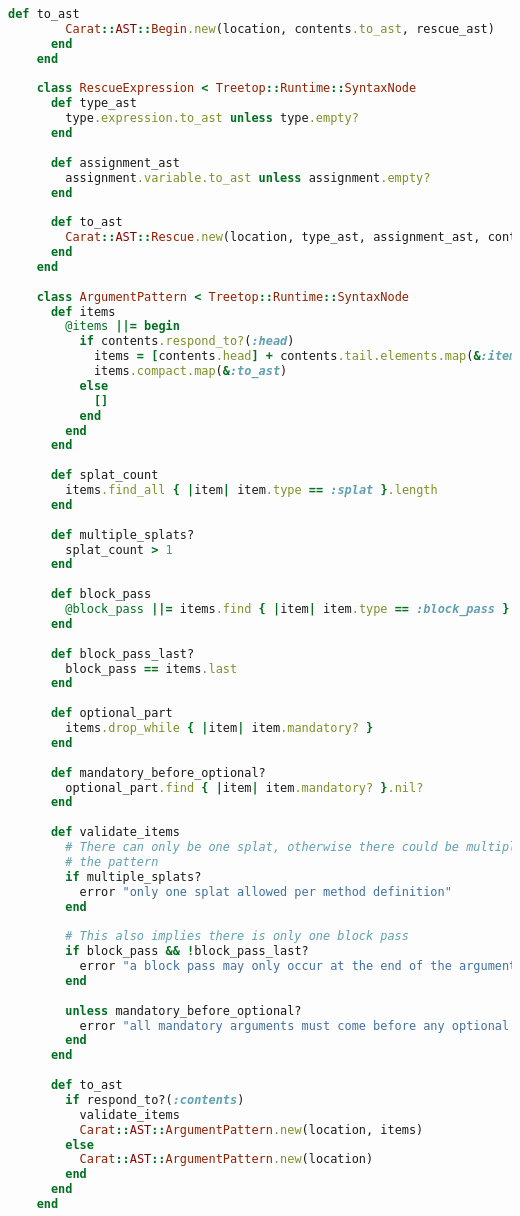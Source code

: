 \begin{lstlisting}[title={\small\ttfamily\bfseries parser/nodes.rb},language=Ruby]
      def to_ast
        Carat::AST::Begin.new(location, contents.to_ast, rescue_ast)
      end
    end
    
    class RescueExpression < Treetop::Runtime::SyntaxNode
      def type_ast
        type.expression.to_ast unless type.empty?
      end
      
      def assignment_ast
        assignment.variable.to_ast unless assignment.empty?
      end
      
      def to_ast
        Carat::AST::Rescue.new(location, type_ast, assignment_ast, contents.to_ast)
      end
    end
    
    class ArgumentPattern < Treetop::Runtime::SyntaxNode
      def items
        @items ||= begin
          if contents.respond_to?(:head)
            items = [contents.head] + contents.tail.elements.map(&:item)
            items.compact.map(&:to_ast)
          else
            []
          end
        end
      end
      
      def splat_count
        items.find_all { |item| item.type == :splat }.length
      end
      
      def multiple_splats?
        splat_count > 1
      end
      
      def block_pass
        @block_pass ||= items.find { |item| item.type == :block_pass }
      end
      
      def block_pass_last?
        block_pass == items.last
      end
      
      def optional_part
        items.drop_while { |item| item.mandatory? }
      end
      
      def mandatory_before_optional?
        optional_part.find { |item| item.mandatory? }.nil?
      end
      
      def validate_items
        # There can only be one splat, otherwise there could be multiple ways to map arguments onto
        # the pattern
        if multiple_splats?
          error "only one splat allowed per method definition"
        end
        
        # This also implies there is only one block pass
        if block_pass && !block_pass_last?
          error "a block pass may only occur at the end of the argument list in a method definition"
        end
        
        unless mandatory_before_optional?
          error "all mandatory arguments must come before any optional ones"
        end
      end
      
      def to_ast
        if respond_to?(:contents)
          validate_items
          Carat::AST::ArgumentPattern.new(location, items)
        else
          Carat::AST::ArgumentPattern.new(location)
        end
      end
    end
    

\end{lstlisting}
